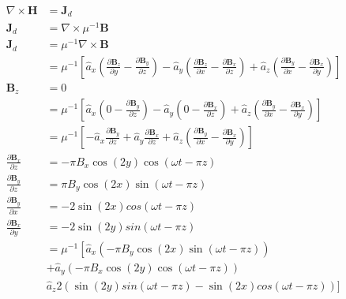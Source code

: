 \documentclass[12pt]{article}
\begin{document}
\begin{align*}
  \nabla \times \bm{H} &= \bm{J}_d\label{h_current}\\
  \bm{J}_d &= \nabla \times \mu^{-1}\bm{B}\\
  \bm{J}_d &= \mu^{-1}\nabla \times \bm{B}\\
  &= \mu^{-1} \left[\hat a_x\left(\frac{\partial\bm{B}_z}{\partial y} - \frac{\partial\bm{B}_y}{\partial z}\right) - \hat a_y\left( \frac{\partial\bm{B}_z}{\partial x} - \frac{\partial\bm{B}_x}{\partial z}  \right) + \hat a_z\left( \frac{\partial\bm{B}_y}{\partial x} -  \frac{\partial\bm{B}_x}{\partial y}\right)\right]\\
  \bm{B}_z &= 0\\
  &= \mu^{-1}\left[\hat a_x\left(0 - \frac{\partial\bm{B}_y}{\partial z}\right) - \hat a_y\left( 0 - \frac{\partial\bm{B}_x}{\partial z}  \right) + \hat a_z\left( \frac{\partial\bm{B}_y}{\partial x} -  \frac{\partial\bm{B}_x}{\partial y}\right)\right]\\
  &= \mu^{-1}\left[-\hat a_x \frac{\partial\bm{B}_y}{\partial z} + \hat a_y \frac{\partial\bm{B}_x}{\partial z} + \hat a_z\left(\frac{\partial\bm{B}_y}{\partial x} -  \frac{\partial\bm{B}_x}{\partial y}\right)\right]\\
  \frac{\partial\bm{B}_x}{\partial z} & = -\pi B_x \cos(2y) \cos(\omega t - \pi z)\\
  \frac{\partial\bm{B}_y}{\partial z} & = \pi B_y \cos(2x) \sin(\omega t - \pi z)\\
  \frac{\partial\bm{B}_y}{\partial x} & = -2\sin(2x)cos(\omega t - \pi z)\\
  \frac{\partial\bm{B}_x}{\partial y} & = -2\sin(2y)sin(\omega t - \pi z)\\
  &= \mu^{-1} \left[\hat a_x(- \pi B_y \cos(2x) \sin(\omega t - \pi z) ) \\
  &+ \hat a_y (-\pi B_x \cos(2y) \cos(\omega t - \pi z))\\
  &\hat a_z 2(\sin(2y)sin(\omega t - \pi z) - \sin(2x)cos(\omega t - \pi z))] \\
\end{align*}


\end{document}

